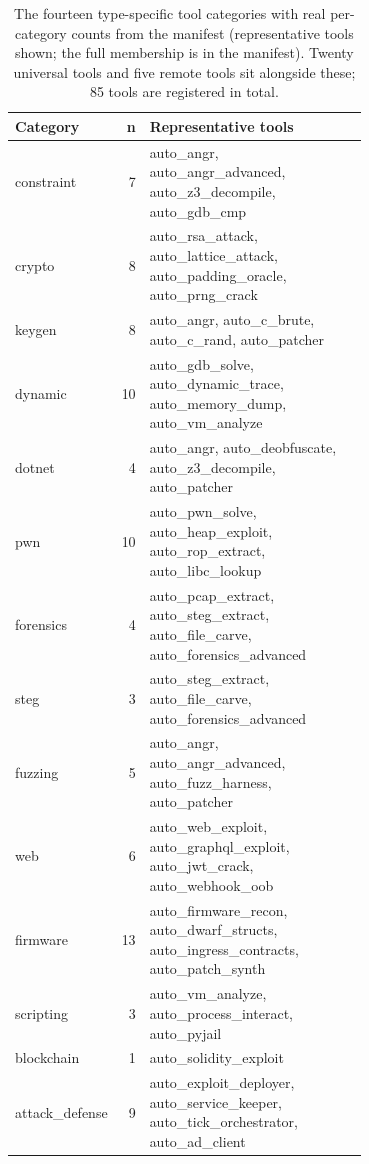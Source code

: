 \documentclass[10pt,twocolumn]{article}
\begin{document}
\begin{table}[t]
  \centering\small
  \setlength{\tabcolsep}{7pt}\renewcommand{\arraystretch}{1.25}
  \begin{tabular}{@{}l r >{\ttfamily\raggedright\arraybackslash}p{0.70\linewidth}@{}}
    \toprule
    \textbf{Category} & \textbf{n} & \normalfont\textbf{Representative tools} \\
    \midrule
    constraint      & 7  & auto\_angr, auto\_angr\_advanced, auto\_z3\_decompile, auto\_gdb\_cmp \\
    crypto          & 8  & auto\_rsa\_attack, auto\_lattice\_attack, auto\_padding\_oracle, auto\_prng\_crack \\
    keygen          & 8  & auto\_angr, auto\_c\_brute, auto\_c\_rand, auto\_patcher \\
    dynamic         & 10 & auto\_gdb\_solve, auto\_dynamic\_trace, auto\_memory\_dump, auto\_vm\_analyze \\
    dotnet          & 4  & auto\_angr, auto\_deobfuscate, auto\_z3\_decompile, auto\_patcher \\
    pwn             & 10 & auto\_pwn\_solve, auto\_heap\_exploit, auto\_rop\_extract, auto\_libc\_lookup \\
    forensics       & 4  & auto\_pcap\_extract, auto\_steg\_extract, auto\_file\_carve, auto\_forensics\_advanced \\
    steg            & 3  & auto\_steg\_extract, auto\_file\_carve, auto\_forensics\_advanced \\
    fuzzing         & 5  & auto\_angr, auto\_angr\_advanced, auto\_fuzz\_harness, auto\_patcher \\
    web             & 6  & auto\_web\_exploit, auto\_graphql\_exploit, auto\_jwt\_crack, auto\_webhook\_oob \\
    firmware        & 13 & auto\_firmware\_recon, auto\_dwarf\_structs, auto\_ingress\_contracts, auto\_patch\_synth \\
    scripting       & 3  & auto\_vm\_analyze, auto\_process\_interact, auto\_pyjail \\
    blockchain      & 1  & auto\_solidity\_exploit \\
    attack\_defense & 9  & auto\_exploit\_deployer, auto\_service\_keeper, auto\_tick\_orchestrator, auto\_ad\_client \\
    \bottomrule
  \end{tabular}
  \caption{The fourteen type-specific tool categories with real per-category counts from the manifest
  (representative tools shown; the full membership is in the manifest). Twenty universal tools and five remote
  tools sit alongside these; 85 tools are registered in total.}
  \label{tab:categories}
\end{table}
\end{document}

